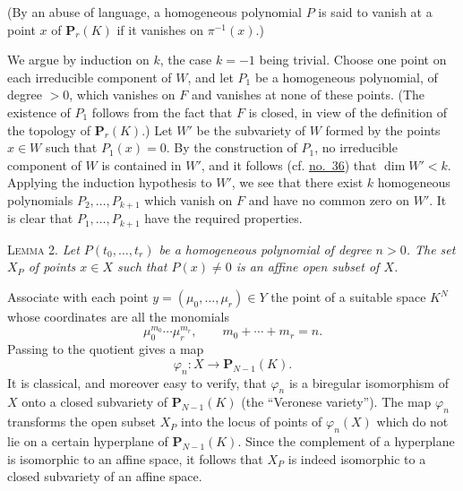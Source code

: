 (By an abuse of language, a homogeneous polynomial $P$ is said to vanish at
a point $x$ of $\mathbf{P}_r(K)$ if it vanishes on $\pi^{-1}(x)$.)

We argue by induction on $k$, the case $k=-1$ being trivial. Choose one
point on each irreducible component of $W$, and let $P_1$ be a homogeneous
polynomial, of degree $>0$, which vanishes on $F$ and vanishes at none of
these points. (The existence of $P_1$ follows from the fact that $F$ is
closed, in view of the definition of the topology of $\mathbf{P}_r(K)$.)
Let $W'$ be the subvariety of $W$ formed by the points $x\in W$ such that
$P_1(x)=0$. By the construction of $P_1$, no irreducible component of $W$
is contained in $W'$, and it follows (cf. \hyperref[fac:II:1:no:36]{no.~36}) that $\dim W'<k$.
Applying the induction hypothesis to $W'$, we see that there exist $k$
homogeneous polynomials $P_2,\ldots,P_{k+1}$ which vanish on $F$ and have no
common zero on $W'$. It is clear that
$P_1,\ldots,P_{k+1}$ have the required properties.

\label{fac:III:1:lemma:2}
\textsc{Lemma 2.}
\textit{Let $P(t_0,\ldots,t_r)$ be a homogeneous polynomial of degree
$n>0$. The set $X_P$ of points $x\in X$ such that $P(x)\neq0$ is an affine
open subset of $X$.}

Associate with each point $y=(\mu_0,\ldots,\mu_r)\in Y$ the point of a
suitable space $K^N$ whose coordinates are all the monomials
\[
\mu_0^{m_0}\cdots\mu_r^{m_r},
\qquad m_0+\cdots+m_r=n.
\]
Passing to the quotient gives a map
\label{fac:III:1:no:52:map:veronese}
\[
\varphi_n:X\longrightarrow\mathbf{P}_{N-1}(K).
\]
It is classical, and moreover easy to verify, that $\varphi_n$ is a
biregular isomorphism of $X$ onto a closed subvariety of
$\mathbf{P}_{N-1}(K)$ (the ``Veronese variety''). The map $\varphi_n$
transforms the open subset $X_P$ into the locus of points of $\varphi_n(X)$
which do not lie on a certain hyperplane of $\mathbf{P}_{N-1}(K)$. Since
the complement of a hyperplane is isomorphic to an affine space, it follows
that $X_P$ is indeed isomorphic to a closed subvariety of an affine space.

